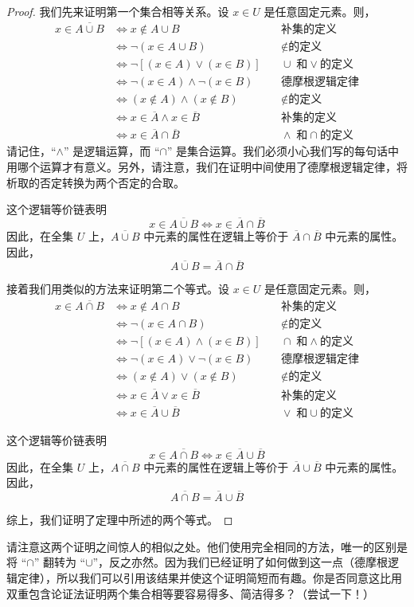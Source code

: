 \begin{proof}
    我们先来证明第一个集合相等关系。设 $x \in U$ 是任意固定元素。则，
    \begin{align*}
        x \in \overline{A \cup B} &\iff x \notin A \cup B &\quad \text{补集的定义}\\
        &\iff \neg(x \in A \cup B) &\quad \notin \text{的定义}\\
        &\iff \neg[(x \in A) \lor (x \in B)] &\quad \cup \;\text{和} \lor \text{的定义}\\
        &\iff \neg(x \in A) \land \neg(x \in B) &\quad \text{德摩根逻辑定律}\\
        &\iff (x \notin A) \land (x \notin B) &\quad \notin \text{的定义}\\
        &\iff x \in \overline{A} \land x \in \overline{B} &\quad \text{补集的定义}\\
        &\iff x \in \overline{A} \cap \overline{B} &\quad \land \;\text{和} \cap \text{的定义}
    \end{align*}
    请记住，``$\land$'' 是逻辑运算，而 ``$\cap$'' 是集合运算。我们必须小心我们写的每句话中用哪个运算才有意义。另外，请注意，我们在证明中间使用了德摩根逻辑定律，将析取的否定转换为两个否定的合取。

    这个逻辑等价链表明
    \[x \in \overline{A \cup B} \iff x \in \overline{A} \cap \overline{B}\]
    因此，在全集 $U$ 上，$\overline{A \cup B}$ 中元素的属性在逻辑上等价于 $\overline{A} \cap \overline{B}$ 中元素的属性。因此，
    \[\overline{A \cup B} = \overline{A} \cap \overline{B}\]

    接着我们用类似的方法来证明第二个等式。设 $x \in U$ 是任意固定元素。则，
    \begin{align*}
        x \in \overline{A \cap B} &\iff x \notin A \cap B &\quad \text{补集的定义}\\
        &\iff \neg(x \in A \cap B) &\quad \notin \text{的定义}\\
        &\iff \neg[(x \in A) \land (x \in B)] &\quad \cap \;\text{和} \land \text{的定义}\\
        &\iff \neg(x \in A) \lor \neg(x \in B) &\quad \text{德摩根逻辑定律}\\
        &\iff (x \notin A) \lor (x \notin B) &\quad \notin \text{的定义}\\
        &\iff x \in \overline{A} \lor x \in \overline{B} &\quad \text{补集的定义}\\
        &\iff x \in \overline{A} \cup \overline{B} &\quad \lor \;\text{和} \cup \text{的定义}
    \end{align*}

    这个逻辑等价链表明
    \[x \in \overline{A \cap B} \iff x \in \overline{A} \cup \overline{B}\]
    因此，在全集 $U$ 上，$\overline{A \cap B}$ 中元素的属性在逻辑上等价于 $\overline{A} \cup \overline{B}$ 中元素的属性。因此，
    \[\overline{A \cap B} = \overline{A} \cup \overline{B}\]

    综上，我们证明了定理中所述的两个等式。
\end{proof}

请注意这两个证明之间惊人的相似之处。他们使用完全相同的方法，唯一的区别是将 ``$\cap$'' 翻转为 ``$\cup$''，反之亦然。因为我们已经证明了如何做到这一点（德摩根逻辑定律），所以我们可以引用该结果并使这个证明简短而有趣。你是否同意这比用双重包含论证法证明两个集合相等要容易得多、简洁得多？（尝试一下！）
